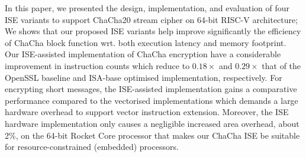 In this paper, we presented the design, implementation, and evaluation of four ISE variants to support ChaCha20 stream cipher on 64-bit RISC-V architecture; 
We shows that our proposed ISE variants help improve significantly the efficiency of ChaCha block function wrt. both execution latency and memory footprint.  
Our ISE-assisted implementation of ChaCha encryption have a considerable improvement in instruction counts which reduce to $0.18\times$ and $0.29\times$ that of the OpenSSL baseline and ISA-base optimised implementation, respectively. 
For encrypting short messages, the ISE-assisted implementation gains a comparative performance compared to the vectorised implementations which demands a large hardware overhead to support vector instruction extension.
Moreover, the ISE hardware implementation only causes a negligible increased area overhead, about 2\%, on the 64-bit Rocket Core processor that makes our ChaCha ISE be suitable for resource-constrained (embedded) processors.




